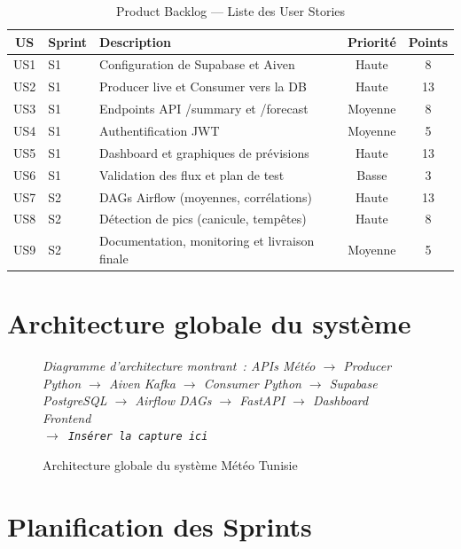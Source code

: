 \documentclass[a4paper,12pt,oneside]{report}
\newcommand{\imgplaceholder}[2]{%
  \begin{tcolorbox}[colback=blue!5,colframe=blue!40,title=#1]
    \centering\itshape #2\\[6pt]
    \texttt{$\rightarrow$ Insérer la capture ici}
  \end{tcolorbox}
}
\begin{document}
\begin{table}[H]
\centering
\caption{Product Backlog — Liste des User Stories}
\label{tab:backlog}
\begin{tabularx}{\textwidth}{clXcc}
\toprule
\textbf{US} & \textbf{Sprint} & \textbf{Description} & \textbf{Priorité} & \textbf{Points} \\
\midrule
US1 & S1 & Configuration de Supabase et Aiven            & Haute & 8 \\
US2 & S1 & Producer live et Consumer vers la DB            & Haute & 13 \\
US3 & S1 & Endpoints API /summary et /forecast             & Moyenne & 8 \\
US4 & S1 & Authentification JWT                             & Moyenne & 5 \\
US5 & S1 & Dashboard et graphiques de prévisions            & Haute & 13 \\
US6 & S1 & Validation des flux et plan de test              & Basse & 3 \\
\midrule
US7 & S2 & DAGs Airflow (moyennes, corrélations)            & Haute & 13 \\
US8 & S2 & Détection de pics (canicule, tempêtes)            & Haute & 8 \\
US9 & S2 & Documentation, monitoring et livraison finale     & Moyenne & 5 \\
\bottomrule
\end{tabularx}
\end{table}

\section{Architecture globale du système}

\begin{figure}[H]
\centering
\imgplaceholder{Figure~\ref{fig:archi_globale} — Architecture globale du pipeline}{Diagramme d'architecture montrant~: APIs Météo $\rightarrow$ Producer Python $\rightarrow$ Aiven Kafka $\rightarrow$ Consumer Python $\rightarrow$ Supabase PostgreSQL $\rightarrow$ Airflow DAGs $\rightarrow$ FastAPI $\rightarrow$ Dashboard Frontend}
\caption{Architecture globale du système Météo Tunisie}
\label{fig:archi_globale}
\end{figure}

\section{Planification des Sprints}
\end{document}
